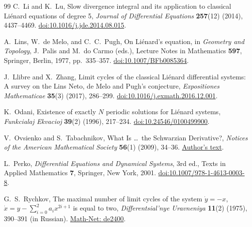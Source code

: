 \begin{thebibliography}{99}
C.~Li and K.~Lu,
Slow divergence integral and its application to classical
Li\'enard equations of degree 5,
\emph{Journal of Differential Equations} \textbf{257}(12)
(2014), 4437--4469.
\href{https://doi.org/10.1016/j.jde.2014.08.015}{doi:10.1016/j.jde.2014.08.015}.

A.~Lins, W.~de Melo, and C.~C.~Pugh,
On Li\'enard's equation,
in \emph{Geometry and Topology}, J.~Palis and M.~do Carmo (eds.),
Lecture Notes in Mathematics \textbf{597},
Springer, Berlin, 1977, pp.~335--357.
\href{https://doi.org/10.1007/BFb0085364}{doi:10.1007/BFb0085364}.

J.~Llibre and X.~Zhang,
Limit cycles of the classical Li\'enard differential systems:
A survey on the Lins Neto, de Melo and Pugh's conjecture,
\emph{Expositiones Mathematicae} \textbf{35}(3) (2017), 286--299.
\href{https://doi.org/10.1016/j.exmath.2016.12.001}{doi:10.1016/j.exmath.2016.12.001}.

K.~Odani,
Existence of exactly $N$ periodic solutions for Li\'enard systems,
\emph{Funkcialaj Ekvacioj} \textbf{39}(2) (1996), 217--234.
\href{https://doi.org/10.24546/0100499900}{doi:10.24546/0100499900}.

V.~Ovsienko and S.~Tabachnikov,
What Is \ldots\ the Schwarzian Derivative?,
\emph{Notices of the American Mathematical Society}
\textbf{56}(1) (2009), 34--36.
\href{https://ovsienko.perso.math.cnrs.fr/Publis/what-is.pdf}{Author's text}.

L.~Perko,
\emph{Differential Equations and Dynamical Systems},
3rd ed., Texts in Applied Mathematics \textbf{7},
Springer, New York, 2001.
\href{https://doi.org/10.1007/978-1-4613-0003-8}{doi:10.1007/978-1-4613-0003-8}.

G.~S.~Rychkov,
The maximal number of limit cycles of the system
$\dot y=-x$, $\dot x=y-\sum_{i=0}^{2}a_i x^{2i+1}$
is equal to two,
\emph{Differentsial'nye Uravneniya} \textbf{11}(2) (1975),
390--391 (in Russian).
\href{https://www.mathnet.ru/eng/de2400}{Math-Net: de2400}.

\end{thebibliography}
